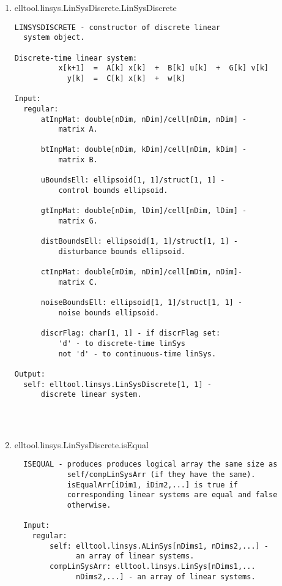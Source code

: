 \begin{enumerate}
\begin{lstlisting}
\end{lstlisting}
\fontfamily{\familydefault}
\selectfont
\item {elltool.linsys.LinSysDiscrete.LinSysDiscrete}
\selectfont
\begin{lstlisting}
LINSYSDISCRETE - constructor of discrete linear
  system object.

Discrete-time linear system:
          x[k+1]  =  A[k] x[k]  +  B[k] u[k]  +  G[k] v[k]
            y[k]  =  C[k] x[k]  +  w[k]

Input:
  regular:
      atInpMat: double[nDim, nDim]/cell[nDim, nDim] -
          matrix A.

      btInpMat: double[nDim, kDim]/cell[nDim, kDim] -
          matrix B.

      uBoundsEll: ellipsoid[1, 1]/struct[1, 1] -
          control bounds ellipsoid.

      gtInpMat: double[nDim, lDim]/cell[nDim, lDim] -
          matrix G.

      distBoundsEll: ellipsoid[1, 1]/struct[1, 1] -
          disturbance bounds ellipsoid.

      ctInpMat: double[mDim, nDim]/cell[mDim, nDim]-
          matrix C.

      noiseBoundsEll: ellipsoid[1, 1]/struct[1, 1] -
          noise bounds ellipsoid.

      discrFlag: char[1, 1] - if discrFlag set:
          'd' - to discrete-time linSys
          not 'd' - to continuous-time linSys.

Output:
  self: elltool.linsys.LinSysDiscrete[1, 1] -
      discrete linear system.




\end{lstlisting}
\fontfamily{\familydefault}
\selectfont
\item {elltool.linsys.LinSysDiscrete.isEqual}
\selectfont
\begin{lstlisting}
  ISEQUAL - produces produces logical array the same size as
            self/compLinSysArr (if they have the same).
            isEqualArr[iDim1, iDim2,...] is true if
            corresponding linear systems are equal and false
            otherwise.

  Input:
    regular:
        self: elltool.linsys.ALinSys[nDims1, nDims2,...] -
              an array of linear systems.
        compLinSysArr: elltool.linsys.LinSys[nDims1,...
              nDims2,...] - an array of linear systems.


\end{lstlisting}
\end{enumerate}
